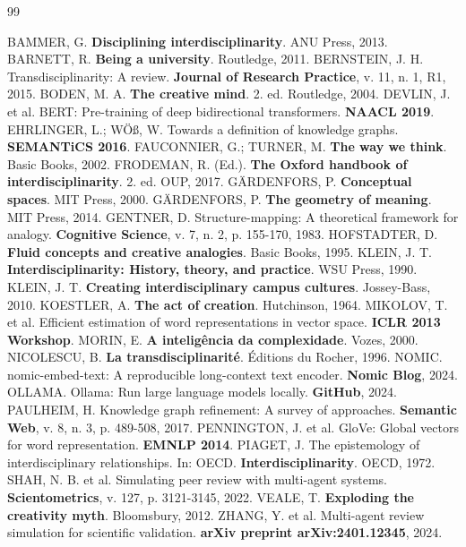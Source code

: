 \documentclass[a4paper,12pt]{article}
\begin{document}
\begin{thebibliography}{99}

 BAMMER, G. \textbf{Disciplining interdisciplinarity}. ANU Press, 2013.
 BARNETT, R. \textbf{Being a university}. Routledge, 2011.
 BERNSTEIN, J. H. Transdisciplinarity: A review. \textbf{Journal of Research Practice}, v. 11, n. 1, R1, 2015.
 BODEN, M. A. \textbf{The creative mind}. 2. ed. Routledge, 2004.
 DEVLIN, J. et al. BERT: Pre-training of deep bidirectional transformers. \textbf{NAACL 2019}.
 EHRLINGER, L.; WÖß, W. Towards a definition of knowledge graphs. \textbf{SEMANTiCS 2016}.
 FAUCONNIER, G.; TURNER, M. \textbf{The way we think}. Basic Books, 2002.
 FRODEMAN, R. (Ed.). \textbf{The Oxford handbook of interdisciplinarity}. 2. ed. OUP, 2017.
 GÄRDENFORS, P. \textbf{Conceptual spaces}. MIT Press, 2000.
 GÄRDENFORS, P. \textbf{The geometry of meaning}. MIT Press, 2014.
 GENTNER, D. Structure-mapping: A theoretical framework for analogy. \textbf{Cognitive Science}, v. 7, n. 2, p. 155-170, 1983.
 HOFSTADTER, D. \textbf{Fluid concepts and creative analogies}. Basic Books, 1995.
 KLEIN, J. T. \textbf{Interdisciplinarity: History, theory, and practice}. WSU Press, 1990.
 KLEIN, J. T. \textbf{Creating interdisciplinary campus cultures}. Jossey-Bass, 2010.
 KOESTLER, A. \textbf{The act of creation}. Hutchinson, 1964.
 MIKOLOV, T. et al. Efficient estimation of word representations in vector space. \textbf{ICLR 2013 Workshop}.
 MORIN, E. \textbf{A inteligência da complexidade}. Vozes, 2000.
 NICOLESCU, B. \textbf{La transdisciplinarité}. Éditions du Rocher, 1996.
 NOMIC. nomic-embed-text: A reproducible long-context text encoder. \textbf{Nomic Blog}, 2024.
 OLLAMA. Ollama: Run large language models locally. \textbf{GitHub}, 2024.
 PAULHEIM, H. Knowledge graph refinement: A survey of approaches. \textbf{Semantic Web}, v. 8, n. 3, p. 489-508, 2017.
 PENNINGTON, J. et al. GloVe: Global vectors for word representation. \textbf{EMNLP 2014}.
 PIAGET, J. The epistemology of interdisciplinary relationships. In: OECD. \textbf{Interdisciplinarity}. OECD, 1972.
 SHAH, N. B. et al. Simulating peer review with multi-agent systems. \textbf{Scientometrics}, v. 127, p. 3121-3145, 2022.
 VEALE, T. \textbf{Exploding the creativity myth}. Bloomsbury, 2012.
 ZHANG, Y. et al. Multi-agent review simulation for scientific validation. \textbf{arXiv preprint arXiv:2401.12345}, 2024.

\end{thebibliography}
\end{document}
